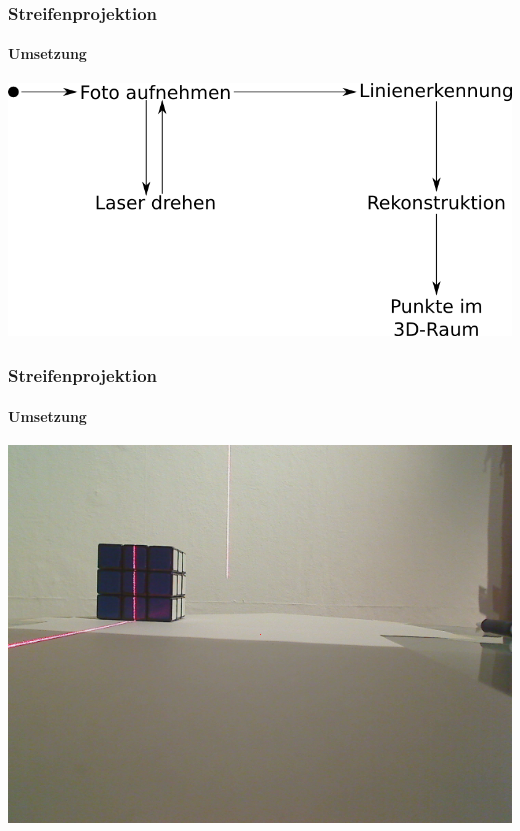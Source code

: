 \documentclass[xcolor=dvipsnames]{beamer}
\begin{document}
\begin{frame}
	\frametitle{Streifenprojektion}
	\framesubtitle{Umsetzung}

	
	\includegraphics[width=\linewidth]{includes/blockbild.png}

\end{frame}
\begin{frame}
	\frametitle{Streifenprojektion}
	\framesubtitle{Umsetzung}

	
	\includegraphics[width=0.9\linewidth]{includes/cap.png}

\end{frame}
\end{document}
